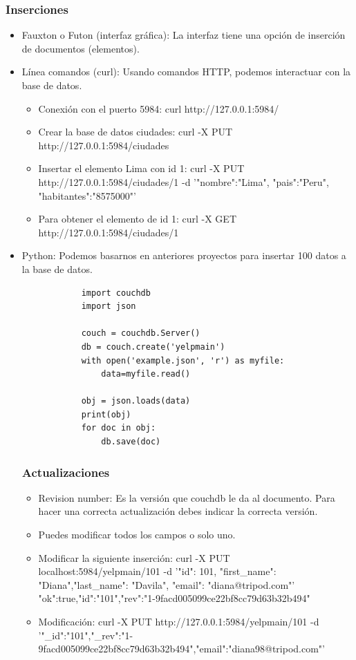 \documentclass{article}
\begin{document}
            \subsubsection{Inserciones}
             \begin{itemize}
                 \item Fauxton o Futon (interfaz gráfica): La interfaz tiene una opción de inserción de documentos (elementos).
                 \item Línea comandos (curl): Usando comandos HTTP, podemos interactuar con la base de datos.
                 \begin{itemize}
                     \item Conexión con el puerto 5984: curl http://127.0.0.1:5984/
                     \item Crear la base de datos ciudades: curl -X PUT http://127.0.0.1:5984/ciudades
                     \item Insertar el elemento Lima con id 1: curl -X PUT http://127.0.0.1:5984/ciudades/1 -d '{"nombre":"Lima", "pais":"Peru", "habitantes":"8575000"}'
                     \item Para obtener el elemento de id 1: curl -X GET http://127.0.0.1:5984/ciudades/1
                 \end{itemize}
                 \item Python: Podemos basarnos en anteriores proyectos para insertar 100 datos a la base de datos.
                 \begin{lstlisting}
            import couchdb
            import json
        
            couch = couchdb.Server()
            db = couch.create('yelpmain')
            with open('example.json', 'r') as myfile:
                data=myfile.read()
            
            obj = json.loads(data)
            print(obj)
            for doc in obj:
                db.save(doc)
                 \end{lstlisting}
            \subsubsection{Actualizaciones}
            \begin{itemize}
                \item Revision number: Es la versión que couchdb le da al documento. Para hacer una correcta actualización debes indicar la correcta versión.
                \item Puedes modificar todos los campos o solo uno.
                \item Modificar la siguiente inserción: curl -X PUT localhost:5984/yelpmain/101 -d '{"id": 101, "first_name": "Diana","last_name": "Davila", "email": "diana@tripod.com"}'
                {"ok":true,"id":"101","rev":"1-9facd005099ce22bf8cc79d63b32b494"}
                \item Modificación: curl -X PUT http://127.0.0.1:5984/yelpmain/101 -d '{"_id":"101","_rev":"1-9facd005099ce22bf8cc79d63b32b494","email":"diana98@tripod.com"}' 
            \end{itemize}

\end{itemize}
\end{document}
